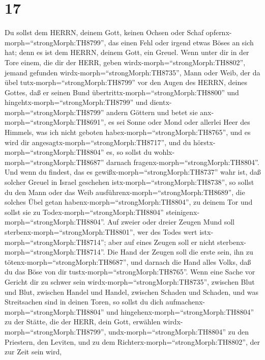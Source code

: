 \hypertarget{section-16}{%
\section{17}\label{section-16}}

 Du sollst dem HERRN, deinem Gott, keinen Ochsen oder Schaf
opfernx-morph=``strongMorph:TH8799'', das einen Fehl oder irgend etwas
Böses an sich hat; denn es ist dem HERRN, deinem Gott, ein Greuel.
 Wenn unter dir in der Tore einem, die dir der HERR, geben
wirdx-morph=``strongMorph:TH8802'', jemand gefunden
wirdx-morph=``strongMorph:TH8735'', Mann oder Weib, der da übel
tutx-morph=``strongMorph:TH8799'' vor den Augen des HERRN, deines
Gottes, daß er seinen Bund übertrittx-morph=``strongMorph:TH8800''
 und hingehtx-morph=``strongMorph:TH8799'' und
dientx-morph=``strongMorph:TH8799'' andern Göttern und betet sie
anx-morph=``strongMorph:TH8691'', es sei Sonne oder Mond oder allerlei
Heer des Himmels, was ich nicht geboten
habex-morph=``strongMorph:TH8765'',  und es wird dir
angesagtx-morph=``strongMorph:TH8717'', und du
hörstx-morph=``strongMorph:TH8804'' es, so sollst du
wohlx-morph=``strongMorph:TH8687'' darnach
fragenx-morph=``strongMorph:TH8804''. Und wenn du findest, das es
gewißx-morph=``strongMorph:TH8737'' wahr ist, daß solcher Greuel in
Israel geschehen istx-morph=``strongMorph:TH8738'',  so
sollst du den Mann oder das Weib
ausführenx-morph=``strongMorph:TH8689'', die solches Übel getan
habenx-morph=``strongMorph:TH8804'', zu deinem Tor und sollst sie zu
Todex-morph=``strongMorph:TH8804''
steinigenx-morph=``strongMorph:TH8804''.  Auf zweier oder
dreier Zeugen Mund soll sterbenx-morph=``strongMorph:TH8801'', wer des
Todes wert istx-morph=``strongMorph:TH8714''; aber auf eines Zeugen soll
er nicht sterbenx-morph=``strongMorph:TH8714''.  Die Hand
der Zeugen soll die erste sein, ihn zu
tötenx-morph=``strongMorph:TH8687'', und darnach die Hand alles Volks,
daß du das Böse von dir tustx-morph=``strongMorph:TH8765''. 
Wenn eine Sache vor Gericht dir zu schwer sein
wirdx-morph=``strongMorph:TH8735'', zwischen Blut und Blut, zwischen
Handel und Handel, zwischen Schaden und Schaden, und was Streitsachen
sind in deinen Toren, so sollst du dich
aufmachenx-morph=``strongMorph:TH8804'' und
hingehenx-morph=``strongMorph:TH8804'' zu der Stätte, die der HERR, dein
Gott, erwählen wirdx-morph=``strongMorph:TH8799'', 
undx-morph=``strongMorph:TH8804'' zu den Priestern, den Leviten, und zu
dem Richterx-morph=``strongMorph:TH8802'', der zur Zeit sein wird,
